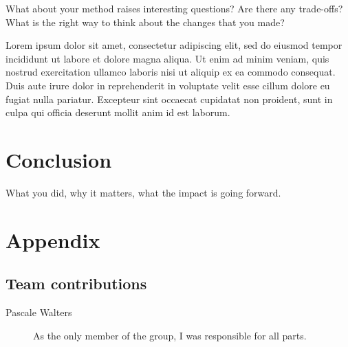 \documentclass[10pt,twocolumn,letterpaper]{article}
\begin{document}
What about your method raises interesting questions? Are there any trade-offs? What is the right way to think about the changes that you made?

Lorem ipsum dolor sit amet, consectetur adipiscing elit, sed do eiusmod tempor incididunt ut labore et dolore magna aliqua. Ut enim ad minim veniam, quis nostrud exercitation ullamco laboris nisi ut aliquip ex ea commodo consequat. Duis aute irure dolor in reprehenderit in voluptate velit esse cillum dolore eu fugiat nulla pariatur. Excepteur sint occaecat cupidatat non proident, sunt in culpa qui officia deserunt mollit anim id est laborum.

\section{Conclusion}

What you did, why it matters, what the impact is going forward.

{\small


}

\section*{Appendix}

\subsection*{Team contributions}

\begin{description}
\item[Pascale Walters] As the only member of the group, I was responsible for all parts.
\end{description}
\end{document}
